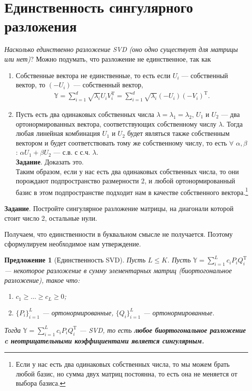 \documentclass[specialist, 12pt,
subf, %
href, colorlinks=true,
substylefile = spbu.rtx,
]{disser}
\newtheorem{proposition}{Предложение}
\begin{document}
\section{Единственность сингулярного разложения}
\textit{Насколько единственно разложение SVD (оно одно существует для матрицы или нет)}?
Можно подумать, что разложение не единственное, так как
\begin{enumerate}
	\item Собственные вектора не единственные, то есть если $U_i$ --- собственный вектор, то $(-U_i)$ --- собственный вектор,
	\begin{gather*}
	\mathbb{Y} = \sum\limits_{i = 1}^d \sqrt{\lambda_i}U_i V_i^{\mathrm{T}} = \sum\limits_{i = 1}^d \sqrt{\lambda_i}(-U_i) (-V_i)^{\mathrm{T}}.
	\end{gather*}
	\item Пусть есть два одинаковых собственных числа $\lambda = \lambda_1 = \lambda_2$, $U_1$ и $U_2$ --- два ортонормированных вектора, соответствующих собственному числу $\lambda$. Тогда любая линейная комбинация $U_1$ и $U_2$ будет являться также собственным вектором и будет соответствовать тому же собственному числу, то есть $\forall$ $\alpha, \beta$: $\alpha U_1 + \beta U_2$ --- с.в. с с.ч. $\lambda$. \\
\textbf{Задание}. Доказать это.\\
Таким образом, если у нас есть два одинаковых собственных числа, то они порождают подпространство размерности 2, и любой ортонормированный базис в этом подпространстве подходит нам в качестве собственного вектора.\footnote{Если у нас есть два одинаковых собственных числа, то мы можем брать любой базис, но сумма двух матриц постоянна, то есть она не меняется от выбора базиса.  }
\end{enumerate}

\textbf{Задание}. Постройте сингулярное разложение матрицы, на диагонали которой стоит число 2, остальные нули.

Получаем, что единственности в буквальном смысле не получается. Поэтому сформулируем необходимое нам утверждение.
\begin{proposition}[Единственность SVD]
	Пусть $L\le K$. Пусть $\mathbb{Y} = \sum\limits_{i = 1}^L c_i P_i Q_i^{\mathrm{T}}$ --- некоторое разложение в сумму элементарных матриц (биортогональное разложение), такое что:
	\begin{enumerate}
		\item $c_1 \geq \ldots \geq c_L \geq 0$;
		\item $\{P_i\}_{i=1}^L$ --- ортонормированные, $\{Q_i\}_{i=1}^L$ --- ортонормированные.
	\end{enumerate}
Тогда $\mathbb{Y} = \sum\limits_{i = 1}^L c_i P_i Q_i^{\mathrm{T}}$ --- SVD, то есть \textit{\textbf{любое биортогональное разложение c неотрицательными коэффициентами является сингулярным.}}
\end{proposition}
\end{document}
